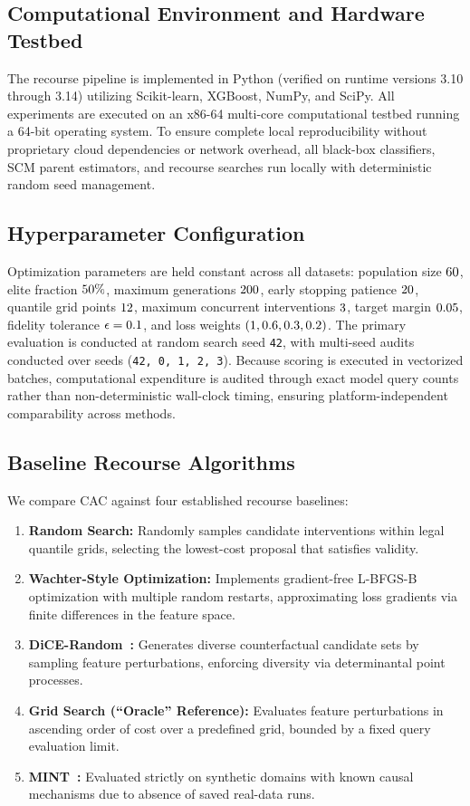 \documentclass[nolineno]{paper/ieee-access/ieeeaccess}%
\newcommand{\CAC}{CAC}
\newcommand{\artifact}[1]{\nolinkurl{#1}}
\begin{document}
\subsection{Computational Environment and Hardware Testbed}
The recourse pipeline is implemented in Python (verified on runtime versions 3.10 through 3.14) utilizing Scikit-learn, XGBoost, NumPy, and SciPy. All experiments are executed on an x86-64 multi-core computational testbed running a 64-bit operating system. To ensure complete local reproducibility without proprietary cloud dependencies or network overhead, all black-box classifiers, SCM parent estimators, and recourse searches run locally with deterministic random seed management.

\subsection{Hyperparameter Configuration}
Optimization parameters are held constant across all datasets: population size $60{}$, elite fraction $50{}\%$, maximum generations $200{}$, early stopping patience $20{}$, quantile grid points $12{}$, maximum concurrent interventions $3{}$, target margin $0.05{}$, fidelity tolerance $\epsilon=0.1{}$, and loss weights $(1, 0.6, 0.3, 0.2)$. The primary evaluation is conducted at random search seed \artifact{42}, with multi-seed audits conducted over \CacSeeds{} seeds (\artifact{42, 0, 1, 2, 3}). Because scoring is executed in vectorized batches, computational expenditure is audited through exact model query counts rather than non-deterministic wall-clock timing, ensuring platform-independent comparability across methods.

\subsection{Baseline Recourse Algorithms}
We compare \CAC{} against four established recourse baselines:
\begin{enumerate}
\item \textbf{Random Search:} Randomly samples candidate interventions within legal quantile grids, selecting the lowest-cost proposal that satisfies validity.
\item \textbf{Wachter-Style Optimization:} Implements gradient-free L-BFGS-B optimization with multiple random restarts, approximating loss gradients via finite differences in the feature space.
\item \textbf{DiCE-Random~\cite{mothilal2020dice}:} Generates diverse counterfactual candidate sets by sampling feature perturbations, enforcing diversity via determinantal point processes.
\item \textbf{Grid Search (``Oracle'' Reference):} Evaluates feature perturbations in ascending order of cost over a predefined grid, bounded by a fixed query evaluation limit.
\item \textbf{MINT~\cite{karimi2020imperfect}:} Evaluated strictly on synthetic domains with known causal mechanisms due to absence of saved real-data runs.
\end{enumerate}
\end{document}
